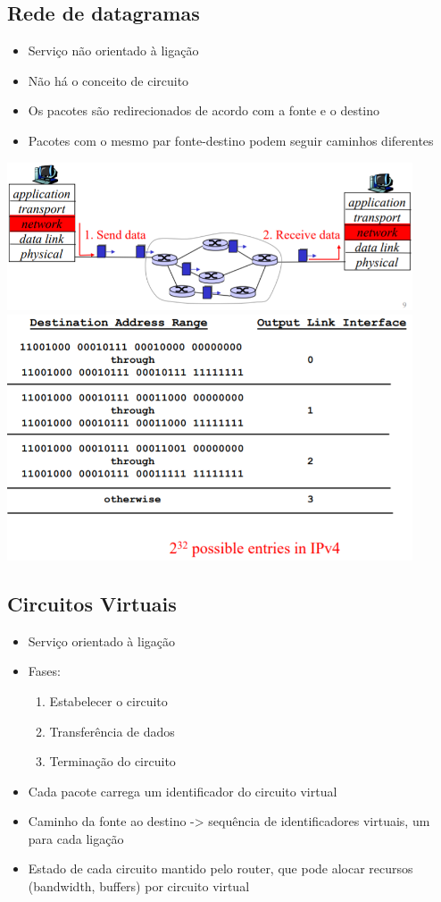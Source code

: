 \documentclass{article}
\begin{document}
\subsection{Rede de datagramas}
\begin{itemize}
    \item Serviço não orientado à ligação
	\item Não há o conceito de circuito
	\item Os pacotes são redirecionados de acordo com a fonte e o destino
	\item Pacotes com o mesmo par fonte-destino podem seguir caminhos diferentes
\end{itemize}
\begin{center}            
    \includegraphics[width=12cm]{images/RCOM2.png}
    \includegraphics[width=12cm]{images/RCOM3.png}
\end{center}

\subsection{Circuitos Virtuais}
\begin{itemize}
    \item Serviço orientado à ligação
	\item Fases:
	\begin{enumerate}
	    \item Estabelecer o circuito
		\item Transferência de dados
		\item Terminação do circuito
	\end{enumerate}
	\item Cada pacote carrega um identificador do circuito virtual
    \item Caminho da fonte ao destino -> sequência de identificadores virtuais, um para cada ligação
	\item Estado de cada circuito mantido pelo router, que pode alocar recursos (bandwidth, buffers) por circuito virtual
\end{itemize}
\end{document}
